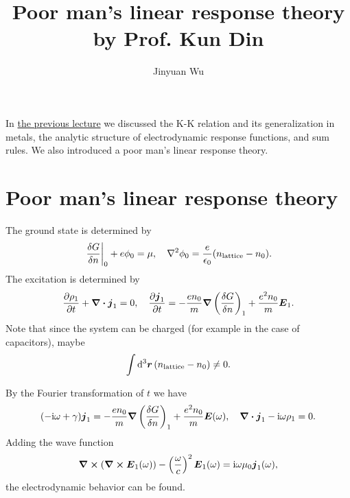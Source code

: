\documentclass[hyperref, a4paper]{article}
\title{Poor man's linear response theory by Prof. Kun Din}
\author{Jinyuan Wu}
\newcommand*{\ii}{\mathrm{i}}
\begin{document}
\maketitle

In \href{./lecture-10-20}{the previous lecture} we discussed the K-K relation and its generalization in metals, the analytic structure of electrodynamic response functions, and sum rules.
We also introduced a poor man's linear response theory.

\section{Poor man's linear response theory}

The ground state is determined by
\begin{equation}
    \eval{\fdv{G}{n}}_{0} + e \phi_0 = \mu, \quad \laplacian \phi_0 = \frac{e}{\epsilon_0} (n_\text{lattice} - n_0).
\end{equation}
The excitation is determined by 
\begin{equation}
    \pdv{\rho_1}{t} + \div{\vb*{j}_1} = 0, \quad \pdv{\vb*{j}_1}{t} = - \frac{e n_0}{m} \grad \left( \fdv{G}{n} \right)_1 + \frac{e^2 n_0}{m} \vb*{E}_1.
\end{equation}
Note that since the system can be charged (for example in the case of capacitors), maybe 
\begin{equation}
    \int \dd[3]{\vb*{r}} (n_\text{lattice} - n_0) \neq 0.
\end{equation}

By the Fourier transformation of $t$ we have 
\begin{equation}
    (- \ii \omega + \gamma) \vb*{j}_1 = - \frac{e n_0}{m} \grad \left( \fdv{G}{n} \right)_1 + \frac{e^2 n_0}{m} \vb*{E}(\omega), \quad \div{\vb*{j}_1} - \ii \omega \rho_1 = 0.
\end{equation}
Adding the wave function 
\begin{equation}
    \curl(\curl{\vb*{E}_1(\omega)}) - \left( \frac{\omega}{c} \right)^2 \vb*{E}_1(\omega) = \ii \omega \mu_0 \vb*{j}_1(\omega),
\end{equation}
the electrodynamic behavior can be found.
\end{document}
